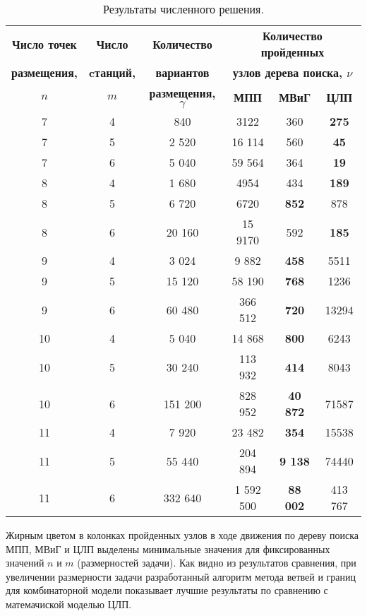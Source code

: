 \begin{table}[b]\centering
  \caption{Результаты численного решения.}\label{tab:models_comparation}
  \begin{tabular}{|ccc|*{3}{c}|} \cline{3-6}
  \hline
  \textbf{Число точек} & \textbf{Число} &\textbf{Количество} & \multicolumn{3}{c|}{\textbf{Количество пройденных}}\\ 
  \textbf{размещения,} & \textbf{cтанций,} & \textbf{вариантов} & \multicolumn{3}{c|}{\textbf{узлов дерева поиска, $\nu$}}\\
  \cline{4-6}
  \textbf{$n$} & \textbf{$m$} &\textbf{размещения, $\gamma$} & \textbf{МПП}& \textbf{МВиГ} & \textbf{ЦЛП} \\ 
  \hline
  7 &  4 & 840 & 3122 & 360 &  \textbf{275} \\
  7 &  5 & 2 520 & 16 114 & 560  &  \textbf{45}  \\
  7 &  6 & 5 040 & 59 564 & 364  &  \textbf{19}  \\
  8 &  4 & 1 680 &  4954 &  434 &   \textbf{189} \\
  8 &  5 & 6 720 & 6720 & \textbf{852}  &  878 \\
  8 &  6 & 20 160 &  15 9170 & 592  & \textbf{185}  \\
  9  &  4 & 3 024 & 9 882 & \textbf{458} & 5511 \\
  9  &  5 & 15 120&  58 190 &  \textbf{768} &  1236\\
  9  &  6 & 60 480&  366 512 &  \textbf{720} & 13294 \\
  10 &  4 & 5 040&  14 868&  \textbf{800}&  6243\\
  10 &	5 & 30 240&  113 932&  \textbf{414}&  8043\\
  10 &	6 & 151 200&  828 952&  \textbf{40 872}&  71587\\
  11 &  4 & 7 920& 23 482&  \textbf{354} & 15538\\
  11 &	5 & 55 440& 204 894& \textbf{9 138}&  74440\\
  11 &	6 & 332 640& 1 592 500 & \textbf{88 002} & 413 767 \\
  \hline
  \end{tabular}
\end{table}
Жирным цветом в колонках пройденных узлов в ходе движения по дереву поиска МПП, МВиГ и ЦЛП выделены минимальные значения для фиксированных значений $n$ и $m$ (размерностей задачи). Как видно из результатов сравнения, при увеличении размерности задачи разработанный алгоритм метода ветвей и границ для комбинаторной модели показывает лучшие результаты по сравнению с матемачиской моделью ЦЛП.


